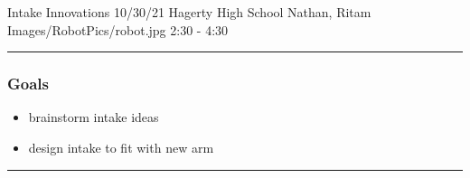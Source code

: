 \insertmeeting 
	{Intake Innovations} 
	{10/30/21}
	{Hagerty High School}
	{Nathan, Ritam}
	{Images/RobotPics/robot.jpg}
	{2:30 - 4:30}
	
\noindent\hfil\rule{\textwidth}{.4pt}\hfil
\subsubsection*{Goals}
\begin{itemize}
    \item brainstorm intake ideas
    \item design intake to fit with new arm 

\end{itemize} 

\noindent\hfil\rule{\textwidth}{.4pt}\hfil

